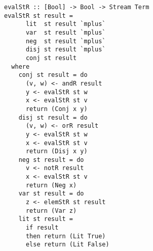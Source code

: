 

\begin{figure}[!t]
  \centering
  \begin{minipage}{0.49\textwidth}
    \begin{lstlisting}[label={eval_st_r}, caption={Functional implementation of the direction \lstinline{evalo out in in}}, captionpos=b, frame=tb]
evalStR :: [Bool] -> Bool -> Stream Term
evalStR st result =
      lit  st result `mplus`
      var  st result `mplus`
      neg  st result `mplus`
      disj st result `mplus`
      conj st result
  where
    conj st result = do
      (v, w) <- andR result
      y <- evalStR st w
      x <- evalStR st v
      return (Conj x y)
    disj st result = do
      (v, w) <- orR result
      y <- evalStR st w
      x <- evalStR st v
      return (Disj x y)
    neg st result = do
      v <- notR result
      x <- evalStR st v
      return (Neg x)
    var st result = do
      z <- elemStR st result
      return (Var z)
    lit st result =
      if result
      then return (Lit True)
      else return (Lit False)
    \end{lstlisting}
  \end{minipage}
\end{figure}



